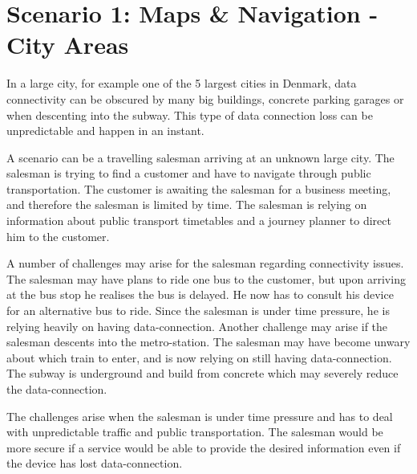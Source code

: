 \section{Scenario 1: Maps \& Navigation - City Areas}
In a large city, for example one of the 5 largest cities in Denmark, data connectivity can be obscured by many big buildings, concrete parking garages or when descenting into the subway. This type of data connection loss can be unpredictable and happen in an instant. 

A scenario can be a travelling salesman arriving at an unknown large city. The salesman is trying to find a customer and have to navigate through public transportation. The customer is awaiting the salesman for a business meeting, and therefore the salesman is limited by time. The salesman is relying on information about public transport timetables and a journey planner to direct him to the customer. 

A number of challenges may arise for the salesman regarding connectivity issues. The salesman may have plans to ride one bus to the customer, but upon arriving at the bus stop he realises the bus is delayed. He now has to consult his device for an alternative bus to ride. Since the salesman is under time pressure, he is relying heavily on having data-connection. Another challenge may arise if the salesman descents into the metro-station. The salesman may have become unwary about which train to enter, and is now relying on still having data-connection. The subway is underground and build from concrete which may severely reduce the data-connection. 

The challenges arise when the salesman is under time pressure and has to deal with unpredictable traffic and public transportation. The salesman would be more secure if a service would be able to provide the desired information even if the device has lost data-connection.